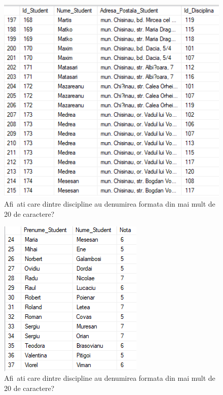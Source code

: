 \documentclass[12pt]{article}
\begin{document}
        \begin{figure}[H]
                \centering
                \includegraphics[width=.95\textwidth]{img9.png}
                \caption{Afi~ati care dintre discipline au denumirea formata din mai mult de 20 de caractere? }
        \end{figure}
        \vspace{0.5 cm}

        \begin{figure}[H]
                \centering
                \includegraphics[width=.95\textwidth]{img10.png}
                \caption{Afi~ati care dintre discipline au denumirea formata din mai mult de 20 de caractere? }
        \end{figure}
        \vspace{0.5 cm}
\end{document}
